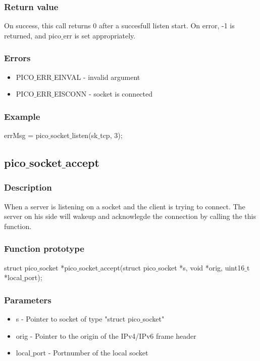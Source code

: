 \subsubsection*{Return value}
On success, this call returns 0 after a succesfull listen start.
On error, -1 is returned, and pico$\_$err is set appropriately. 

\subsubsection*{Errors}
\begin{itemize}
\item PICO$\_$ERR$\_$EINVAL - invalid argument
\item PICO$\_$ERR$\_$EISCONN - socket is connected
\end{itemize}

\subsubsection*{Example}
errMsg = pico$\_$socket$\_$listen(sk$\_$tcp, 3);


\subsection{pico$\_$socket$\_$accept}

\subsubsection*{Description}
When a server is listening on a socket and the client is trying to connect.
The server on his side will wakeup and acknowlegde the connection by calling the this function.

\subsubsection*{Function prototype}
struct pico$\_$socket *pico$\_$socket$\_$accept(struct pico$\_$socket *s, void *orig, uint16$\_$t *local$\_$port);

\subsubsection*{Parameters}
\begin{itemize}
\item s - Pointer to socket of type "struct pico$\_$socket"
\item orig - Pointer to the origin of the IPv4/IPv6 frame header
\item local$\_$port - Portnumber of the local socket
\end{itemize}

